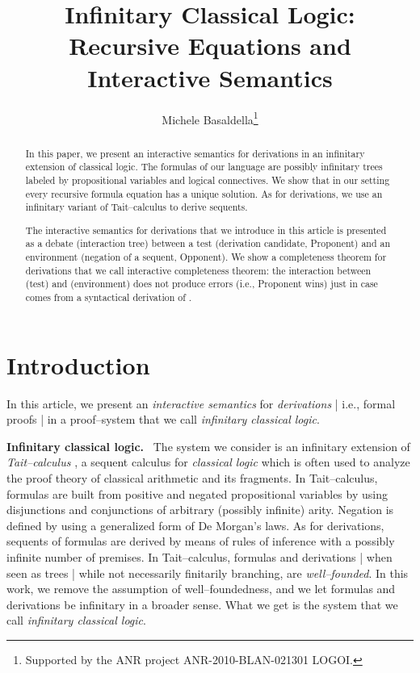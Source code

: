 \documentclass[copyright,creativecommons]{eptcs}
\title{Infinitary Classical Logic: \\  Recursive Equations and  Interactive Semantics}
\author{Michele Basaldella\thanks{Supported by the ANR project ANR-2010-BLAN-021301 LOGOI.}
\institute{Universit\'e d'Aix--Marseille, CNRS, I2M, Marseille, France}
\email{michele.basaldella@gmail.com}
}
\def\ie{i.e., }
\theoremstyle{definition}
\begin{document}
\maketitle

\begin{abstract}
In  this paper, we  present an interactive semantics for derivations  in an infinitary
extension of classical logic.
The formulas of our language are possibly infinitary
 trees labeled by propositional variables and logical
connectives.
We show  that in our setting
 every recursive formula equation
has a unique solution.
As for derivations, we use an infinitary variant of
 Tait--calculus to derive sequents.

 The interactive  semantics for derivations that we introduce  in this article  is  presented as a  debate (interaction tree)
between a  test  (derivation candidate, Proponent) and
an environment    (negation of a sequent, Opponent).
We   show a
completeness theorem for derivations that we call
interactive completeness
 theorem: the interaction between  (test) and
  (environment)
does not produce errors   (\ie Proponent wins)  just in case  comes from a syntactical derivation
of  .


\end{abstract}


\section{Introduction}

In this article, we present an \emph{interactive semantics}
for \emph{derivations} | \ie formal proofs | in a proof--system
that we call \emph{infinitary classical logic}. \\

\vspace{-0.35cm}

 \noindent \textbf{Infinitary classical logic.} \
The system we consider is an infinitary extension of
\emph{Tait--calculus} \cite{Tait68},  a  sequent calculus  for \emph{classical logic}
which is often used to analyze the proof theory of classical arithmetic and its fragments.
In Tait--calculus, formulas
are  built from positive and negated propositional variables by using
disjunctions  and conjunctions 
 of arbitrary (possibly infinite)
arity. Negation  is  defined
by using a generalized form of  De Morgan's laws.
As for derivations,
sequents of formulas are derived by means of rules of
inference with a possibly infinite number of premises.
In Tait--calculus, formulas and derivations | when seen as trees |
 while not necessarily finitarily branching, are \emph{well--founded}.
In this work, we remove the assumption
of well--foundedness, and we let
formulas and derivations be
 infinitary in a broader sense. What  we get is the system that we
 call \emph{infinitary classical logic}. \\
\end{document}
